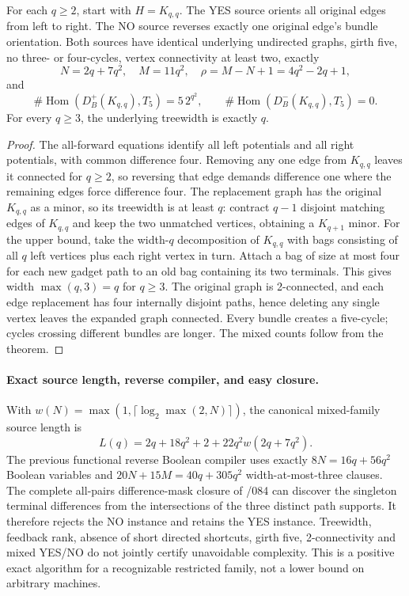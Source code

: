 \documentclass[11pt]{article}
\begin{document}
\begin{corollary}
For each $q\ge2$, start with $H=K_{q,q}$. The YES source
orients all original edges from left to right. The NO source
reverses exactly one original edge's bundle orientation.
Both sources have identical underlying undirected graphs,
girth five, no three- or four-cycles, vertex connectivity
at least two, exactly
\[
 N=2q+7q^2,\quad M=11q^2,\quad
 \rho=M-N+1=4q^2-2q+1,
\]
and
\[
 \boxed{\#\operatorname{Hom}(D_B^+(K_{q,q}),T_5)
           =5\,2^{q^2},\qquad
        \#\operatorname{Hom}(D_B^-(K_{q,q}),T_5)=0.}
\]
For every $q\ge3$, the underlying treewidth is exactly $q$.
\end{corollary}
\begin{proof}
The all-forward equations identify all left potentials and
all right potentials, with common difference four.
Removing any one edge from $K_{q,q}$ leaves it connected
for $q\ge2$, so reversing that edge demands difference one
where the remaining edges force difference four.
The replacement graph has the original $K_{q,q}$ as a minor,
so its treewidth is at least $q$:
contract $q-1$ disjoint matching edges of $K_{q,q}$ and keep
the two unmatched vertices, obtaining a $K_{q+1}$ minor.
For the upper bound, take the width-$q$ decomposition of
$K_{q,q}$ with bags consisting of all $q$ left vertices
plus each right vertex in turn. Attach a bag of size at most
four for each new gadget path to an old bag containing its
two terminals. This gives width $\max(q,3)=q$ for $q\ge3$.
The original graph is 2-connected, and each edge replacement
has four internally disjoint paths, hence deleting any single
vertex leaves the expanded graph connected. Every bundle
creates a five-cycle; cycles crossing different bundles
are longer. The mixed counts follow from the theorem.
\end{proof}

\paragraph{Exact source length, reverse compiler, and easy closure.}
With $w(N)=\max(1,\lceil\log_2\max(2,N)\rceil)$, the canonical
mixed-family source length is
\[
 L(q)=2q+18q^2+2+22q^2w(2q+7q^2).
\]
The previous functional reverse Boolean compiler uses exactly
$8N=16q+56q^2$ Boolean variables and
$20N+15M=40q+305q^2$ width-at-most-three clauses.
The complete all-pairs difference-mask closure of /084
can discover the singleton terminal differences from
the intersections of the three distinct path supports.
It therefore rejects the NO instance and retains the
YES instance. Treewidth, feedback rank, absence of short
directed shortcuts, girth five, 2-connectivity and mixed
YES/NO do not jointly certify unavoidable complexity.
This is a positive exact algorithm for a recognizable
restricted family, not a lower bound on arbitrary machines.
\end{document}
